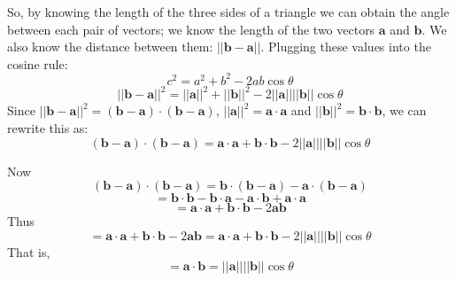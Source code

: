 \documentclass{beamer}
\begin{document}
\begin{frame}
So, by knowing the length of the three sides of a triangle we can obtain the angle between each pair of vectors; we know the length of the two vectors $\mathbf{a}$ and  $\mathbf{b}$. We also know the distance between them: 
$||\mathbf{b}-\mathbf{a}||$.  Plugging these values into the cosine rule:
$$ c^2 = a^2 + b^2 - 2ab\cos{\theta}$$
$$ ||\mathbf{b}-\mathbf{a}||^2 = ||\mathbf{a}||^2 + ||\mathbf{b}||^2  - 2||\mathbf{a}||||\mathbf{b}||\cos{\theta}$$
Since $||\mathbf{b}-\mathbf{a}||^2  = \left( \mathbf{b}-\mathbf{a} \right) \cdot  \left( \mathbf{b}-\mathbf{a} \right)$, 
 $||\mathbf{a}||^2  = \mathbf{a} \cdot   \mathbf{a}$ and 
 $||\mathbf{b}||^2  = \mathbf{b} \cdot   \mathbf{b}$, we can rewrite this as:
 $$\left( \mathbf{b}-\mathbf{a} \right) \cdot  \left( \mathbf{b}-\mathbf{a} \right) = \mathbf{a} \cdot   \mathbf{a} + \mathbf{b} \cdot   \mathbf{b} - 
 2  ||\mathbf{a}||  ||\mathbf{b}|| \cos \theta$$
 
\end{frame}
\begin{frame}


Now 
$$\left( \mathbf{b}-\mathbf{a} \right) \cdot  \left( \mathbf{b}-\mathbf{a} \right)  = \mathbf{b} \cdot \left( \mathbf{b}-\mathbf{a} \right) - \mathbf{a} \cdot \left( \mathbf{b}-\mathbf{a} \right)$$
$$ = \mathbf{b} \cdot \mathbf{b} - \mathbf{b} \cdot \mathbf{a} - \mathbf{a} \cdot \mathbf{b} + \mathbf{a} \cdot \mathbf{a} $$
$$ = \mathbf{a} \cdot \mathbf{a} + \mathbf{b} \cdot \mathbf{b} - 2 \mathbf{a} \mathbf{b} $$
Thus
$$ = \mathbf{a} \cdot \mathbf{a} + \mathbf{b} \cdot \mathbf{b} - 2 \mathbf{a} \mathbf{b}  = \mathbf{a} \cdot \mathbf{a} + \mathbf{b} \cdot \mathbf{b}  - 2 ||\mathbf{a}||  ||\mathbf{b}|| \cos \theta $$
That is,
$$ = \mathbf{a} \cdot \mathbf{b} =  ||\mathbf{a}||  ||\mathbf{b}|| \cos \theta$$

\end{frame}
\end{document}
